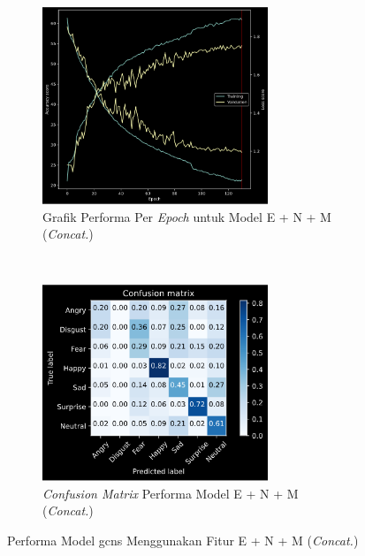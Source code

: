 \begin{figure}[t]
    \centering
    \begin{subfigure}[t]{6.75cm}
        \includegraphics[width=6.75cm]{gambar/eksperimen4b7_grafik1.png}
        \caption{Grafik Performa Per \textit{Epoch} untuk Model E + N + M (\textit{Concat.})}
        \label{fig:confusionmatrixeksperimen4b7}
    \end{subfigure}
    ~~~
    \begin{subfigure}[t]{6.75cm}
        \includegraphics[width=6.75cm]{gambar/eksperimen4b7_matriks1.png}
        \caption{\textit{Confusion Matrix} Performa Model E + N + M (\textit{Concat.})}
        \label{fig:confusionmatrixeksperimen4b7}
    \end{subfigure}
    \caption{Performa Model \acrshort{gcns} Menggunakan Fitur E + N + M (\textit{Concat.})}
    \label{fig:hasileksperimen4b7}
\end{figure}

